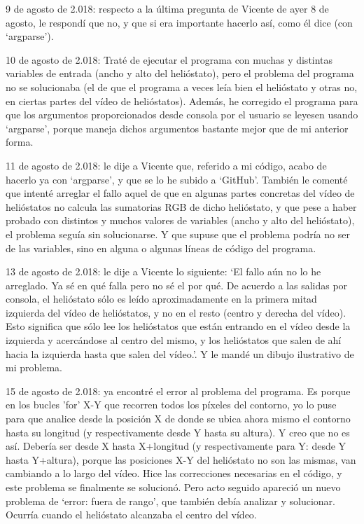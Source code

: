 \documentclass[12pt]{article}
\begin{document}
9 de agosto de 2.018: respecto a la última pregunta de Vicente de ayer 8 de agosto, le respondí que no, y que si era importante hacerlo así, como él dice (con ‘argparse’).

10 de agosto de 2.018: Traté de ejecutar el programa con muchas y distintas variables de entrada (ancho y alto del helióstato), pero el problema del programa no se solucionaba (el de que el programa a veces leía bien el helióstato y otras no, en ciertas partes del vídeo de helióstatos). Además, he corregido el programa para que los argumentos proporcionados desde consola por el usuario se leyesen usando ‘argparse’, porque maneja dichos argumentos bastante mejor que de mi anterior forma.

11 de agosto de 2.018: le dije a Vicente que, referido a mi código, acabo de hacerlo ya con ‘argparse’, y que se lo he subido a ‘GitHub’. También le comenté que intenté arreglar el fallo aquel de que en algunas partes concretas del vídeo de helióstatos no calcula las sumatorias RGB de dicho helióstato, y que pese a haber probado con distintos y muchos valores de variables (ancho y alto del helióstato), el problema seguía sin solucionarse. Y que supuse que el problema podría no ser de las variables, sino en alguna o algunas líneas de código del programa.

13 de agosto de 2.018: le dije a Vicente lo siguiente: ‘El fallo aún no lo he arreglado. Ya sé en qué falla pero no sé el por qué. De acuerdo a las salidas por consola, el helióstato sólo es leído aproximadamente en la primera mitad izquierda del vídeo de helióstatos, y no en el resto (centro y derecha del vídeo). Esto significa que sólo lee los helióstatos que están entrando en el vídeo desde la izquierda y acercándose al centro del mismo, y los helióstatos que salen de ahí hacia la izquierda hasta que salen del vídeo.’. Y le mandé un dibujo ilustrativo de mi problema.

15 de agosto de 2.018: ya encontré el error al problema del programa. Es porque en los bucles 'for' X-Y que recorren todos los píxeles del contorno, yo lo puse para que analice desde la posición X de donde se ubica ahora mismo el contorno hasta su longitud (y respectivamente desde Y hasta su altura). Y creo que no es así. Debería ser desde X hasta X+longitud (y respectivamente para Y: desde Y hasta Y+altura), porque las posiciones X-Y del helióstato no son las mismas, van cambiando a lo largo del vídeo. Hice las correcciones necesarias en el código, y este problema se finalmente se solucionó. Pero acto seguido apareció un nuevo problema de ‘error: fuera de rango’, que también debía analizar y solucionar. Ocurría cuando el helióstato alcanzaba el centro del vídeo.
\end{document}
